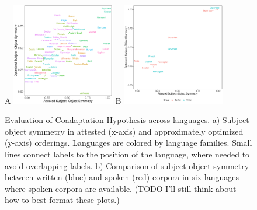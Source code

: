 \documentclass[11pt,a4paper]{article}
\newcommand\comment[1]{{\color{red}#1}}
\newcommand\mhahn[1]{{\color{red}(#1)}}
\begin{document}



\begin{figure}
    \centering
    A
    \includegraphics[width=0.4\textwidth]{../analysis/figures/fracion-optimized_DLM_2.6_format.pdf}
    B
    \includegraphics[width=0.4\textwidth]{../analysis/analysis_spoken/spoken.pdf}
    \caption{Evaluation of Coadaptation Hypothesis across languages. a) Subject-object symmetry in attested (x-axis) and approximately optimized (y-axis) orderings. Languages are colored by language families. Small lines connect labels to the position of the language, where needed to avoid overlapping labels. b) Comparison of subject-object symmetry between written (blue) and spoken (red) corpora in six languages where spoken corpora are available. \mhahn{TODO I'll still think about how to best format these plots.}}
    \label{fig:study1}\label{fig:spoken}
\end{figure}


\end{document}
